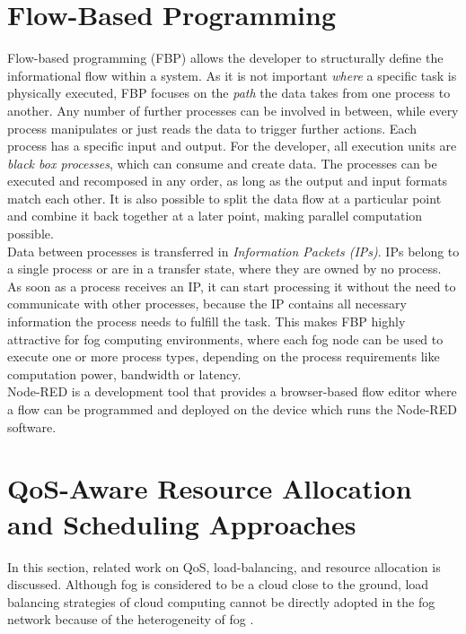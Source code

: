 \section{Flow-Based Programming}
Flow-based programming (FBP) allows the developer to structurally define the informational flow within a system.
As it is not important \textit{where} a specific task is physically executed, FBP focuses on the \textit{path} the data takes from one process to another.
Any number of further processes can be involved in between, while every process manipulates or just reads the data to trigger further actions.
Each process has a specific input and output.
For the developer, all execution units are \textit{black box processes}, which can consume and create data.
The processes can be executed and recomposed in any order, as long as the output and input formats match each other.
It is also possible to split the data flow at a particular point and combine it back together at a later point, making parallel computation possible.\\

Data between processes is transferred in \textit{Information Packets (IPs)}.
IPs belong to a single process or are in a transfer state, where they are owned by no process.
As soon as a process receives an IP, it can start processing it without the need to communicate with other processes, because the IP contains all necessary information the process needs to fulfill the task.
This makes FBP highly attractive for fog computing environments, where each fog node can be used to execute one or more process types, depending on the process requirements like computation power, bandwidth or latency.\\

Node-RED is a development tool that provides a browser-based flow editor where a flow can be programmed and deployed on the device which runs the Node-RED software.




\section{QoS-Aware Resource Allocation and Scheduling Approaches}
In this section, related work on QoS, load-balancing, and resource allocation is discussed.
Although fog is considered to be a cloud close to the ground, load balancing strategies of cloud computing cannot be directly adopted in the fog network because of the heterogeneity of fog \cite{novel-load-balancing}.

